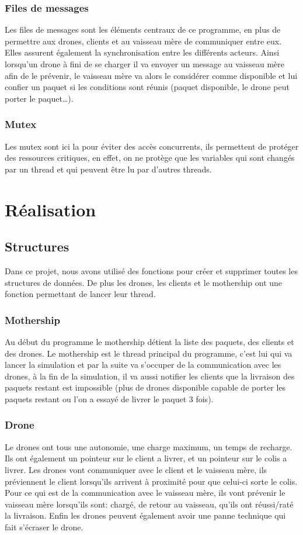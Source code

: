 \documentclass[article, backcover, french, nodocumentinfo]{upmethodology-document}
\begin{document}
			\subsubsection{Files de messages}
				Les files de messages sont les éléments centraux de ce programme, en plus de permettre aux drones,
				clients et au vaisseau mère de communiquer entre eux. Elles assurent également la synchronisation entre
				les différents acteurs. Ainsi lorsqu'un drone à fini de se charger il va envoyer un message au vaisseau
				mère afin de le prévenir, le vaisseau mère va alors le considérer comme disponible et lui confier un paquet
				si les conditions sont réunis (paquet disponible, le drone peut porter le paquet\ldots).
			\subsubsection{Mutex}
				Les mutex sont ici la pour éviter des accès concurrents, ils permettent de protéger des ressources critiques,
				en effet, on ne protège que les variables qui sont changés par un thread et qui peuvent être lu par d'autres threads.

	\section{Réalisation}
		\subsection{Structures}
			Dans ce projet, nous avons utilisé des fonctions pour créer et supprimer toutes les structures de données.
			De plus les drones, les clients et le mothership ont une fonction permettant de lancer leur thread.
			\subsubsection{Mothership}
			Au début du programme le mothership détient la liste des paquets, des clients et des drones.
			Le mothership est le thread principal du programme, c'est lui qui va lancer la simulation et par la suite va s'occuper de
			la communication avec les drones, à la fin de la simulation, il va aussi notifier les clients que la livraison des paquets
			restant est impossible (plus de drones disponible capable de porter les paquets restant ou l'on a essayé de livrer le paquet 3 fois).
			\subsubsection{Drone}
			Le drones ont tous une autonomie, une charge maximum, un temps de recharge. Ils ont également un pointeur sur le client a livrer,
			et un pointeur sur le colis a livrer.
			Les drones vont communiquer avec le client et le vaisseau mère, ils préviennent le client lorsqu'ils arrivent à proximité pour que
			celui-ci sorte le colis. Pour ce qui est de la communication avec le vaisseau mère, ils vont prévenir le vaisseau mère lorsqu'ils sont:
			chargé, de retour au vaisseau, qu'ils ont réussi/raté la livraison.
			Enfin les drones peuvent également avoir une panne technique qui fait s'écraser le drone.
\end{document}

